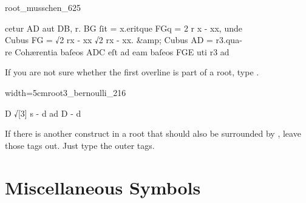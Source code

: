 \vspace{3mm}
\begin{sampleImage}{root_musschen_625}
\begin{typeLatin}
 \someText
{}cetur AD aut DB, r. BG ſit = x.\lwr eritque FGq = 2 r x - x\lwr x, unde  \\
Cubus FG = √\bold{\{}2 rx - xx\lwr{}  √\bold{\{}2 rx - \lwr xx.\bold{\}} &amp; Cubus AD = r3.\lwr qua- \\
re Cohærentia baſeos ADC eſt ad eam baſeos FGE uti r\lwr{}3 ad \\
\someText {}
\end{typeLatin}
\end{sampleImage}

\begin{note}
If you are not sure whether the first overline is part of a root, type .
\end{note}

\vspace{3mm}
\begin{sampleImageSmall}{width=5cm}{root3_bernoulli_216}
\begin{typeLatin}
D √[3] s - d ad D - \lwr{}d
\end{typeLatin}
\end{sampleImageSmall}

\begin{note}
If there is another construct in a root that should also be surrounded by , leave those tags out. Just type the outer  tags.
\end{note}



\section{Miscellaneous Symbols}

